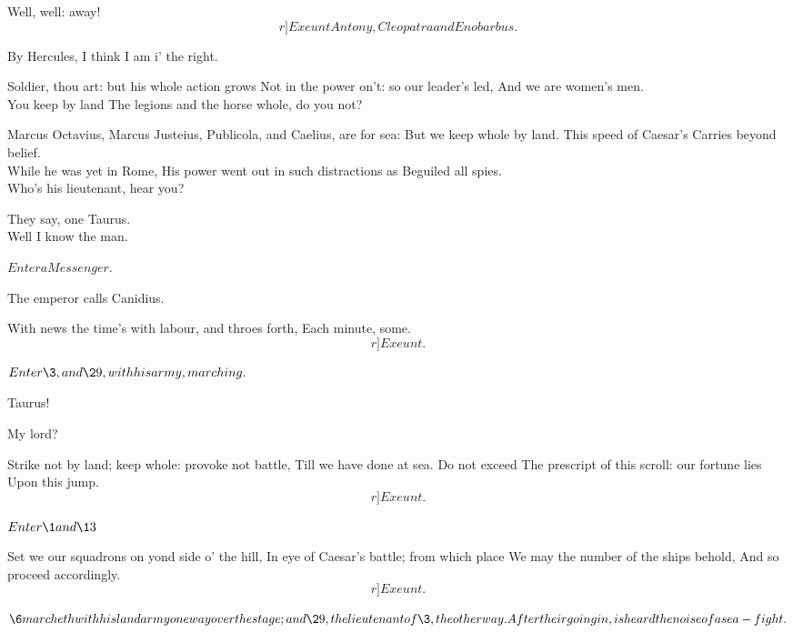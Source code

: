 \documentclass{book}
\begin{document}
\1	Well, well: away! \[r]Exeunt Antony, Cleopatra and Enobarbus.\]

	By Hercules, I think I am i' the right.

\6	Soldier, thou art: but his whole action grows
	Not in the power on't: so our leader's led,
	And we are women's men. \\

	You keep by land
	The legions and the horse whole, do you not?

\6	Marcus Octavius, Marcus Justeius,
	Publicola, and Caelius, are for sea:
	But we keep whole by land. This speed of Caesar's
	Carries beyond belief. \\

	While he was yet in Rome,
	His power went out in such distractions as
	Beguiled all spies. \\

\6	Who's his lieutenant, hear you?

	They say, one Taurus. \\

\6	Well I know the man.

	\(Enter a Messenger.\)

	The emperor calls Canidius.

\6	With news the time's with labour, and throes forth,
	Each minute, some. 	\[r]Exeunt.\]






	\(Enter \3, and \29, with his army, marching.\)

\3	Taurus!

	My lord?

\3	Strike not by land; keep whole: provoke not battle,
	Till we have done at sea. Do not exceed
	The prescript of this scroll: our fortune lies
	Upon this jump. \[r]Exeunt.\]




	\(Enter \1 and \13\)

\1	Set we our squadrons on yond side o' the hill,
	In eye of Caesar's battle; from which place
	We may the number of the ships behold,
	And so proceed accordingly. \[r]Exeunt.\]





	\(\6 marcheth with his land army one way over
	  the stage; and \29, the lieutenant of \3,
          the other way. After their going in, is
	  heard the noise of a sea-fight.\)
\end{document}
